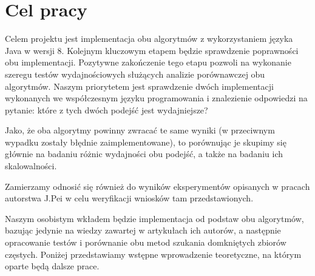 \section{Cel pracy}

Celem projektu jest implementacja obu algorytmów z wykorzystaniem języka Java w wersji 8.
Kolejnym kluczowym etapem będzie sprawdzenie poprawności obu implementacji.
Pozytywne zakończenie tego etapu pozwoli na wykonanie szeregu testów wydajnościowych służących analizie porównawczej obu algorytmów.
Naszym priorytetem jest sprawdzenie dwóch implementacji wykonanych we współczesnym języku programowania i znalezienie odpowiedzi na pytanie: które z tych dwóch podejść jest wydajniejsze?

Jako, że oba algorytmy powinny zwracać te same wyniki (w przeciwnym wypadku zostały błędnie zaimplementowane), to porównując je skupimy się głównie na badaniu różnic wydajności obu podejść, a także na badaniu ich skalowalności.

Zamierzamy odnosić się również do wyników eksperymentów opisanych w pracach autorstwa J.Pei \cite{closetArt} w celu weryfikacji wniosków tam przedstawionych.

Naszym osobistym wkładem będzie implementacja od podstaw obu algorytmów, bazując jedynie na wiedzy zawartej w artykułach ich autorów, a następnie opracowanie testów i porównanie obu metod szukania domkniętych zbiorów częstych.
Poniżej przedstawiamy wstępne wprowadzenie teoretyczne, na którym oparte będą dalsze prace.